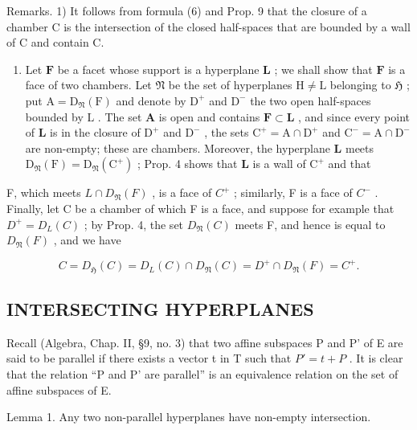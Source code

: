 Remarks. 1) It follows from formula (6) and Prop. 9 that the closure of a chamber C is the intersection of the closed half-spaces that are bounded by a wall of C and contain C.

\begin{enumerate}
\def\labelenumi{\arabic{enumi})}
\setcounter{enumi}{1}
\tightlist
\item
  Let \(\mathbf{F}\) be a facet whose support is a hyperplane \(\mathbf{L}\) ; we shall show that \(\mathbf{F}\) is a face of two chambers. Let \(\mathfrak{N}\) be the set of hyperplanes \(\mathrm{H} \neq \mathrm{L}\) belonging to \(\mathfrak{H}\) ; put \(\mathrm{A} = \mathrm{D}_{\mathfrak{N}}(\mathrm{F})\) and denote by \(\mathrm{D}^{+}\) and \(\mathrm{D}^{-}\) the two open half-spaces bounded by \(\mathrm{L}\) . The set \(\mathbf{A}\) is open and contains \(\mathbf{F} \subset \mathbf{L}\) , and since every point of \(\mathbf{L}\) is in the closure of \(\mathrm{D}^{+}\) and \(\mathrm{D}^{-}\) , the sets \(\mathrm{C}^{+} = \mathrm{A} \cap \mathrm{D}^{+}\) and \(\mathrm{C}^{-} = \mathrm{A} \cap \mathrm{D}^{-}\) are non-empty; these are chambers. Moreover, the hyperplane \(\mathbf{L}\) meets \(\mathrm{D}_{\mathfrak{N}}(\mathrm{F}) = \mathrm{D}_{\mathfrak{N}}(\mathrm{C}^{+})\) ; Prop. 4 shows that \(\mathbf{L}\) is a wall of \(\mathrm{C}^{+}\) and that
\end{enumerate}

F, which meets \(L \cap D_{\mathfrak{N}}(F)\) , is a face of \(C^{+}\) ; similarly, F is a face of \(C^{-}\) . Finally, let C be a chamber of which F is a face, and suppose for example that \(D^{+} = D_{L}(C)\) ; by Prop. 4, the set \(D_{\mathfrak{N}}(C)\) meets F, and hence is equal to \(D_{\mathfrak{N}}(F)\) , and we have

\[
C = D _ {\mathfrak {H}} (C) = D _ {L} (C) \cap D _ {\mathfrak {N}} (C) = D ^ {+} \cap D _ {\mathfrak {N}} (F) = C ^ {+}.
\]

\subsection{INTERSECTING HYPERPLANES}

Recall (Algebra, Chap. II, §9, no. 3) that two affine subspaces P and P' of E are said to be parallel if there exists a vector t in T such that \(P' = t + P\) . It is clear that the relation ``P and P' are parallel'' is an equivalence relation on the set of affine subspaces of E.

Lemma 1. Any two non-parallel hyperplanes have non-empty intersection.

